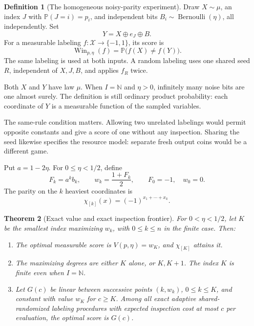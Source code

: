 \documentclass[11pt,a4paper]{article}
\newtheorem{theorem}{Theorem}[section]
\theoremstyle{definition}
\newtheorem{definition}[theorem]{Definition}
\theoremstyle{remark}
\newcommand{\N}{\mathbb N}
\newcommand{\Pbb}{\mathbb P}
\newcommand{\cX}{\mathcal X}
\newcommand{\Win}{\operatorname{Win}}
\begin{document}
\begin{definition}[The homogeneous noisy-parity experiment]
Draw \(X\sim\mu\), an index \(J\) with \(\Pbb(J=i)=p_i\), and
independent bits \(B_i\sim\operatorname{Bernoulli}(\eta)\), all independently.
Set
\[
 Y=X\oplus e_J\oplus B.
\]
For a measurable labeling \(f:\cX\to\{-1,1\}\), its score is
\[
 \Win_{p,\eta}(f)=\Pbb\bigl(f(X)\ne f(Y)\bigr).
\]
The same labeling is used at both inputs. A random labeling uses one
shared seed \(R\), independent of \(X,J,B\), and applies \(f_R\) twice.
\end{definition}

Both \(X\) and \(Y\) have law \(\mu\). When \(I=\N\) and \(\eta>0\),
infinitely many noise bits are one almost surely. The definition is still
ordinary product probability: each coordinate of \(Y\) is a measurable
function of the sampled variables.

The same-rule condition matters. Allowing two unrelated labelings would
permit opposite constants and give a score of one without any inspection.
Sharing the seed likewise specifies the resource model: separate fresh
output coins would be a different game.

Put \(a=1-2\eta\). For \(0\le\eta<1/2\), define
\begin{equation}\label{np:eq:wk}
 F_k=a^k b_k,\qquad w_k=\frac{1+F_k}{2},
 \qquad F_0=-1,\quad w_0=0.
\end{equation}
The parity on the \(k\) heaviest coordinates is
\[
 \chi_{[k]}(x)=(-1)^{x_1+\cdots+x_k}.
\]

\begin{theorem}[Exact value and exact inspection frontier]\label{np:thm:main}
For \(0<\eta<1/2\), let \(K\) be the smallest index maximizing \(w_k\),
with \(0\le k\le n\) in the finite case. Then:
\begin{enumerate}
\item The optimal measurable score is \(V(p,\eta)=w_K\), and
\(\chi_{[K]}\) attains it.
\item The maximizing degrees are either \(K\) alone, or \(K,K+1\).
The index \(K\) is finite even when \(I=\N\).
\item Let \(G(c)\) be linear between successive points
\((k,w_k)\), \(0\le k\le K\), and constant with value \(w_K\) for \(c\ge K\).
Among all exact adaptive shared-randomized labeling procedures with expected
inspection cost at most \(c\) per evaluation, the optimal score is \(G(c)\).
\end{enumerate}
\end{theorem}
\end{document}

